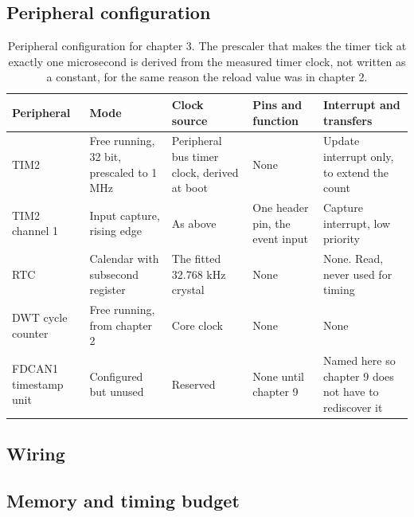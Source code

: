 \subsection*{Peripheral configuration}

\begin{table}[H]\centering\small
\begin{tabular}{p{22mm}p{26mm}p{24mm}p{30mm}p{30mm}}
\toprule
Peripheral & Mode & Clock source & Pins and function & Interrupt and transfers \\
\midrule
TIM2 & Free running, 32 bit, prescaled to 1 MHz & Peripheral bus timer clock, derived at boot & None & Update interrupt only, to extend the count \\
TIM2 channel 1 & Input capture, rising edge & As above & One header pin, the event input & Capture interrupt, low priority \\
RTC & Calendar with subsecond register & The fitted 32.768 kHz crystal & None & None. Read, never used for timing \\
DWT cycle counter & Free running, from chapter 2 & Core clock & None & None \\
FDCAN1 timestamp unit & Configured but unused & Reserved & None until chapter 9 & Named here so chapter 9 does not have to rediscover it \\
\bottomrule
\end{tabular}
\caption{Peripheral configuration for chapter 3. The prescaler that makes the timer tick at exactly one microsecond is derived from the measured timer clock, not written as a constant, for the same reason the reload value was in chapter 2.}
\end{table}

\subsection*{Wiring}


\subsection*{Memory and timing budget}

